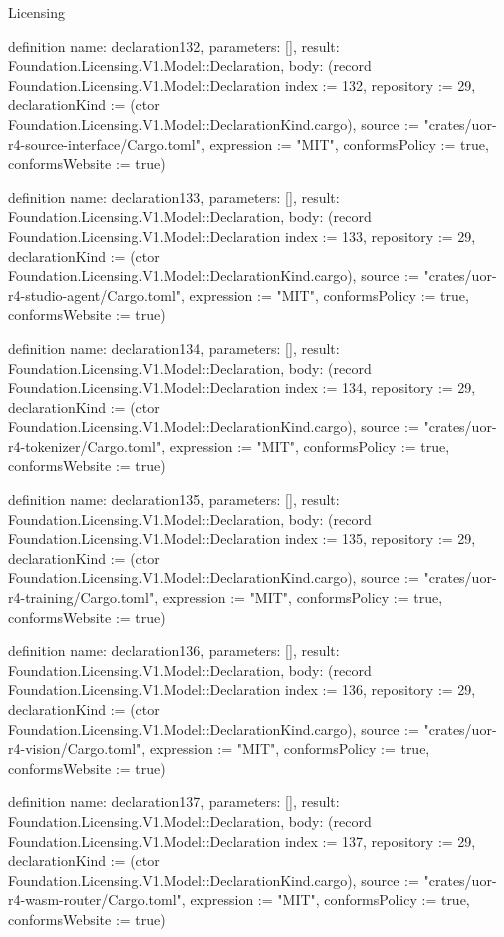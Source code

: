 \begin{lexlean}{Licensing}
\begin{semanticmodule}
definition{
  name: declaration132,
  parameters: [],
  result: Foundation.Licensing.V1.Model::Declaration,
  body: (record Foundation.Licensing.V1.Model::Declaration {index := 132, repository := 29, declarationKind := (ctor Foundation.Licensing.V1.Model::DeclarationKind.cargo), source := "crates/uor-r4-source-interface/Cargo.toml", expression := "MIT", conformsPolicy := true, conformsWebsite := true})
}

definition{
  name: declaration133,
  parameters: [],
  result: Foundation.Licensing.V1.Model::Declaration,
  body: (record Foundation.Licensing.V1.Model::Declaration {index := 133, repository := 29, declarationKind := (ctor Foundation.Licensing.V1.Model::DeclarationKind.cargo), source := "crates/uor-r4-studio-agent/Cargo.toml", expression := "MIT", conformsPolicy := true, conformsWebsite := true})
}

definition{
  name: declaration134,
  parameters: [],
  result: Foundation.Licensing.V1.Model::Declaration,
  body: (record Foundation.Licensing.V1.Model::Declaration {index := 134, repository := 29, declarationKind := (ctor Foundation.Licensing.V1.Model::DeclarationKind.cargo), source := "crates/uor-r4-tokenizer/Cargo.toml", expression := "MIT", conformsPolicy := true, conformsWebsite := true})
}

definition{
  name: declaration135,
  parameters: [],
  result: Foundation.Licensing.V1.Model::Declaration,
  body: (record Foundation.Licensing.V1.Model::Declaration {index := 135, repository := 29, declarationKind := (ctor Foundation.Licensing.V1.Model::DeclarationKind.cargo), source := "crates/uor-r4-training/Cargo.toml", expression := "MIT", conformsPolicy := true, conformsWebsite := true})
}

definition{
  name: declaration136,
  parameters: [],
  result: Foundation.Licensing.V1.Model::Declaration,
  body: (record Foundation.Licensing.V1.Model::Declaration {index := 136, repository := 29, declarationKind := (ctor Foundation.Licensing.V1.Model::DeclarationKind.cargo), source := "crates/uor-r4-vision/Cargo.toml", expression := "MIT", conformsPolicy := true, conformsWebsite := true})
}

definition{
  name: declaration137,
  parameters: [],
  result: Foundation.Licensing.V1.Model::Declaration,
  body: (record Foundation.Licensing.V1.Model::Declaration {index := 137, repository := 29, declarationKind := (ctor Foundation.Licensing.V1.Model::DeclarationKind.cargo), source := "crates/uor-r4-wasm-router/Cargo.toml", expression := "MIT", conformsPolicy := true, conformsWebsite := true})
}


\end{semanticmodule}
\end{lexlean}
